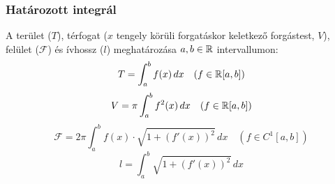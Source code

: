\documentclass[a4paper,11.5pt]{article}
\begin{document}
	\subsubsection{Határozott integrál}
	A terület ($T$), térfogat ($x$ tengely körüli forgatáskor keletkező forgástest, $V$), felület ($\mathcal{F}$) és ívhossz ($l$) meghatározása $a,b\in\mathbb{R}$ intervallumon:
	\[ T=\int_a^bf(x)\,dx\quad (f\in\mathbb{R}[a,b]) \]
	\[ V=\pi\int_a^bf^2(x)\,dx\quad (f\in\mathbb{R}[a,b]) \]
	\[ \mathcal{F}=2\pi\int_a^bf(x)\cdot\sqrt{1+(f'(x))^2}\,dx\quad (f\in C^1[a,b]) \]
	\[ l=\int_a^b\sqrt{1+(f'(x))^2}\,dx \]
\end{document}
